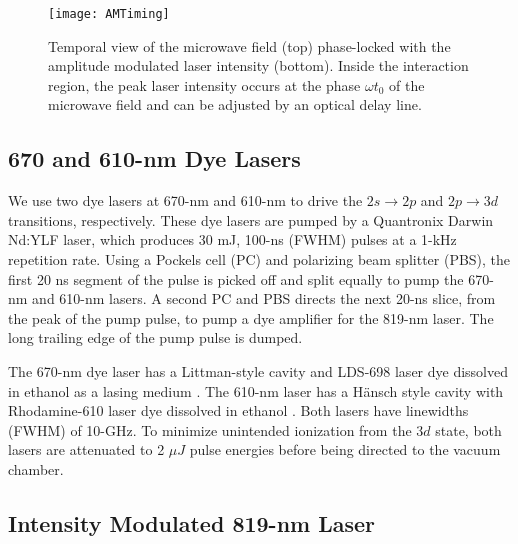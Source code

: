 \documentclass[aps,pra,reprint,groupedaddress]{revtex4-1}
\begin{document}
\begin{figure}
	\texttt{[image: AMTiming]}
	\caption{Temporal view of the microwave field (top) phase-locked with the amplitude modulated laser intensity (bottom). Inside the interaction region, the peak laser intensity occurs at the phase $\omega t_0$ of the microwave field and can be adjusted by an optical delay line.}
	\label{fig:AMLaser}
\end{figure}

\subsection{\label{sec:dye} 670 and 610-nm Dye Lasers}

We use two dye lasers at 670-nm and 610-nm to drive the $2s \rightarrow 2p$ and $2p \rightarrow 3d$ transitions, respectively. These dye lasers are pumped by a Quantronix Darwin Nd:YLF laser, which produces 30 mJ, 100-ns (FWHM) pulses at a 1-kHz repetition rate. Using a Pockels cell (PC) and polarizing beam splitter (PBS), the first 20 ns segment of the pulse is picked off and split equally to pump the 670-nm and 610-nm lasers. A second PC and PBS directs the next 20-ns slice, from the peak of the pump pulse, to pump a dye amplifier for the 819-nm laser. The long trailing edge of the pump pulse is dumped.

The 670-nm dye laser has a Littman-style cavity and LDS-698 laser dye dissolved in ethanol as a lasing medium \cite{Littman}. The 610-nm laser has a H{\"a}nsch style cavity with Rhodamine-610 laser dye dissolved in ethanol \cite{Hansch}. Both lasers have linewidths (FWHM) of 10-GHz. To minimize unintended ionization from the $3d$ state, both lasers are attenuated to 2 $\mu J$ pulse energies before being directed to the vacuum chamber.

\subsection{\label{sec:ampmod} Intensity Modulated 819-nm Laser}
\end{document}
